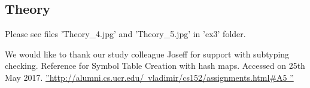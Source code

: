 \documentclass[paper=a4, fontsize=11pt]{scrartcl}
\numberwithin{equation}{section}		%
\numberwithin{figure}{section}			%
\numberwithin{table}{section}				%
\begin{document}
\subsection*{Theory}
Please see files 'Theory\_4.jpg' and 'Theory\_5.jpg' in 'ex3' folder.




\begin{thebibliography}{9}%
We would like to thank our study colleague Joseff for support with subtyping checking. 
Reference for Symbol Table Creation with hash maps. Accessed on 25th May 2017.
\hyperref[label_name]{''http://alumni.cs.ucr.edu/~vladimir/cs152/assignments.html\#A5
''}

\end{thebibliography}
\end{document}
